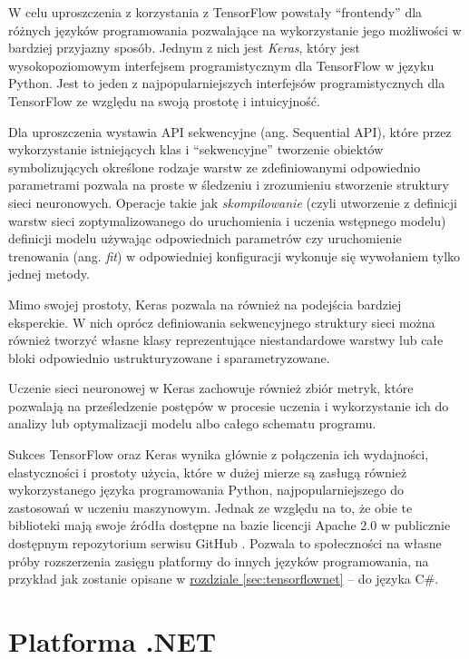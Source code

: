 W celu uproszczenia z korzystania z TensorFlow powstały ``frontendy'' dla różnych języków programowania pozwalające na wykorzystanie jego możliwości w bardziej przyjazny sposób.
Jednym z nich jest \emph{Keras}, który jest wysokopoziomowym interfejsem programistycznym dla TensorFlow w języku Python.
Jest to jeden z najpopularniejszych interfejsów programistycznych dla TensorFlow ze względu na swoją prostotę i intuicyjność.

Dla uproszczenia wystawia API sekwencyjne (ang. Sequential API), które przez wykorzystanie istniejących klas i ``sekwencyjne'' tworzenie obiektów symbolizujących określone rodzaje warstw ze zdefiniowanymi odpowiednio parametrami pozwala na proste w śledzeniu i zrozumieniu stworzenie struktury sieci neuronowych.
Operacje takie jak \emph{skompilowanie} (czyli utworzenie z definicji warstw sieci zoptymalizowanego do uruchomienia i uczenia wstępnego modelu) definicji modelu używając odpowiednich parametrów czy uruchomienie trenowania (ang. \emph{fit}) w odpowiedniej konfiguracji wykonuje się wywołaniem tylko  jednej metody.

Mimo swojej prostoty, Keras pozwala na również na podejścia bardziej eksperckie.
W nich oprócz definiowania sekwencyjnego struktury sieci można również tworzyć własne klasy reprezentujące niestandardowe warstwy lub całe bloki odpowiednio ustrukturyzowane i sparametryzowane.

Uczenie sieci neuronowej w Keras zachowuje również zbiór metryk, które pozwalają na prześledzenie postępów w procesie uczenia i wykorzystanie ich do analizy lub optymalizacji modelu albo całego schematu programu.

Sukces TensorFlow oraz Keras wynika głównie z połączenia ich wydajności, elastyczności i prostoty użycia, które w dużej mierze są zasługą również wykorzystanego języka programowania Python, najpopularniejszego do zastosowań w uczeniu maszynowym.
Jednak ze względu na to, że obie te biblioteki mają swoje źródła dostępne na bazie licencji Apache 2.0 w publicznie dostępnym repozytorium serwisu GitHub \cite{tensorflow}.
Pozwala to społeczności na własne próby rozszerzenia zasięgu platformy do innych języków programowania, na przykład jak zostanie opisane w \hyperref[sec:tensorflownet]{rozdziale \ref*{sec:tensorflownet}} -- do języka C\#.

\section{Platforma .NET}

